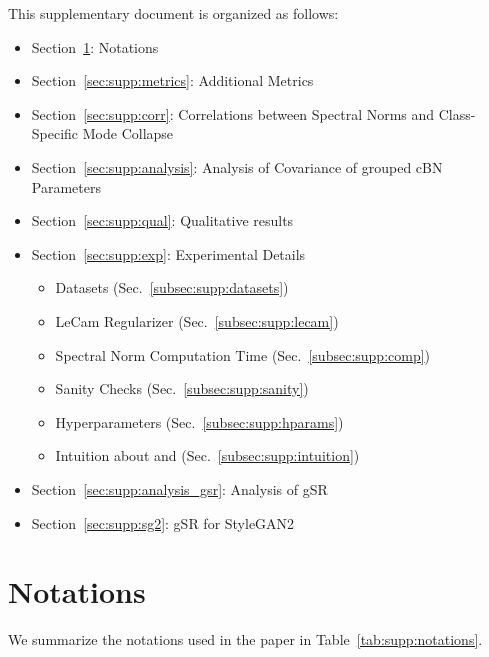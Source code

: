 \documentclass[runningheads,table]{llncs}
\begin{document}
This supplementary document is organized as follows:
\begin{itemize}
\setlength{\itemindent}{-0mm}
    \item Section~\ref{sec:supp:notations}: Notations
    \item Section~\ref{sec:supp:metrics}: Additional Metrics
    \item Section~\ref{sec:supp:corr}: Correlations between Spectral Norms and
Class-Specific Mode Collapse
    \item Section~\ref{sec:supp:analysis}: Analysis of Covariance of grouped cBN Parameters
    \item Section~\ref{sec:supp:qual}: Qualitative results
    \item Section~\ref{sec:supp:exp}: Experimental Details
    \begin{itemize}
        \item Datasets (Sec.~\ref{subsec:supp:datasets})
        \item LeCam Regularizer (Sec.~\ref{subsec:supp:lecam})
        \item Spectral Norm Computation Time (Sec.~\ref{subsec:supp:comp})
        \item Sanity Checks (Sec.~\ref{subsec:supp:sanity})
        \item Hyperparameters (Sec.~\ref{subsec:supp:hparams})
        \item Intuition about  and  (Sec.~\ref{subsec:supp:intuition})
    \end{itemize}
    \item Section~\ref{sec:supp:analysis_gsr}: Analysis of gSR
    \item Section~\ref{sec:supp:sg2}: gSR for StyleGAN2
\end{itemize}{}






\section{Notations}
\label{sec:supp:notations}
\noindent We summarize the notations used in the paper in Table~\ref{tab:supp:notations}.
\end{document}
